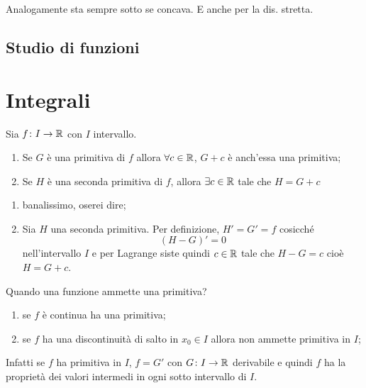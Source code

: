 \documentclass[a4paper]{article}
\begin{document}
Analogamente sta sempre sotto se concava. E anche per la dis. stretta.


\subsection{Studio di funzioni}

\section{Integrali}

\pagebreak

\begin{radioactive}
\begin{snippettheorem}{}
    Sia \(f\colon I \to \mathbb{R}\) con \(I\) intervallo.
    \begin{enumerate}
        \item Se \(G\) è una primitiva di \(f\) allora \(\forall c \in \mathbb{R}\),
        \(G+c\) è anch'essa una primitiva;
        \item Se \(H\) è una seconda primitiva di \(f\), allora \(\exists c \in \mathbb{R}\)
        tale che \(H = G+c\)
    \end{enumerate}
\end{snippettheorem}

\begin{snippetproof}{}
    \begin{enumerate}
        \item banalissimo, oserei dire;
        \item Sia \(H\) una seconda primitiva.
        Per definizione, \(H' = G' = f\) cosicché
        \[
            {(H-G)}' = 0
        \]
        nell'intervallo \(I\) e per Lagrange siste quindi
        \(c\in \mathbb{R}\) tale che \(H-G = c\) cioè \(H=G+c\).
    \end{enumerate}
\end{snippetproof}

Quando una funzione ammette una primitiva?
\begin{enumerate}
    \item se \(f\) è continua ha una primitiva;
    \item se \(f\) ha una discontinuità di salto in \(x_0\in I\) allora non ammette primitiva in \(I\);
\end{enumerate}

Infatti se \(f\)  ha primitiva in \(I\), \(f = G'\)
con \(G \colon I \to \mathbb{R}\) derivabile e quindi \(f\)
ha la proprietà dei valori intermedi in ogni sotto intervallo di \(I\).


\end{radioactive}
\end{document}
